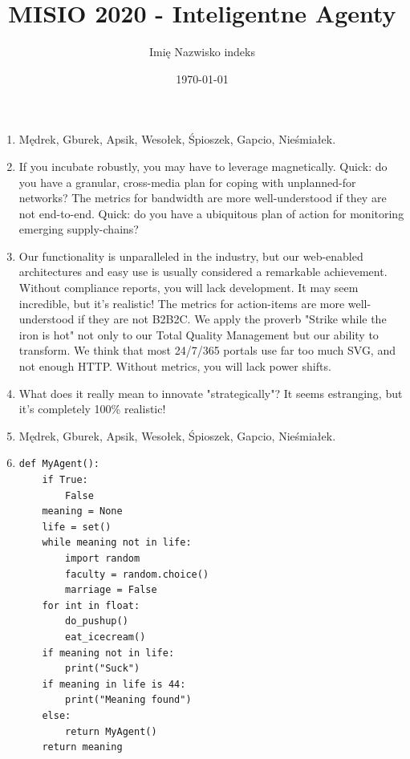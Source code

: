 \documentclass[8pt,a4paper,oneside]{article}
\begin{document}
\title{MISIO 2020 - Inteligentne Agenty}
\author{Imię Nazwisko indeks}
\date{\today}
\maketitle

\begin{enumerate}

\item
	Mędrek, Gburek, Apsik, Wesołek, Śpioszek, Gapcio, Nieśmiałek.

\item
	If you incubate robustly, you may have to leverage magnetically. Quick: do you have a granular, cross-media plan for coping with unplanned-for networks? The metrics for bandwidth are more well-understood if they are not end-to-end. Quick: do you have a ubiquitous plan of action for monitoring emerging supply-chains?

\item
    Our functionality is unparalleled in the industry, but our web-enabled architectures and easy use is usually considered a remarkable achievement. Without compliance reports, you will lack development. It may seem incredible, but it's realistic! The metrics for action-items are more well-understood if they are not B2B2C. We apply the proverb "Strike while the iron is hot" not only to our Total Quality Management but our ability to transform. We think that most 24/7/365 portals use far too much SVG, and not enough HTTP. Without metrics, you will lack power shifts.


\item
	What does it really mean to innovate "strategically"? It seems estranging, but it's completely 100\% realistic!
\item
	Mędrek, Gburek, Apsik, Wesołek, Śpioszek, Gapcio, Nieśmiałek.
\item 

\begin{lstlisting}
def MyAgent():
    if True:
        False
    meaning = None
    life = set()
    while meaning not in life:
        import random
        faculty = random.choice()
        marriage = False
    for int in float:
        do_pushup()
        eat_icecream()
    if meaning not in life:
        print("Suck")
    if meaning in life is 44:
        print("Meaning found")
    else:
        return MyAgent()
    return meaning



\end{lstlisting}
\end{enumerate}
\end{document}
